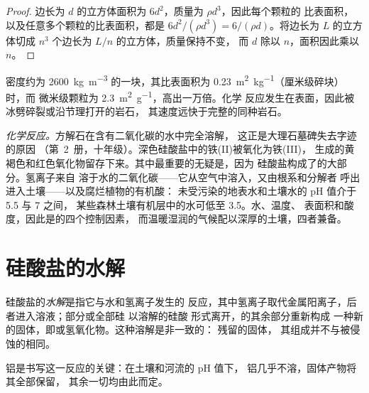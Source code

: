 \begin{proof}
边长为 $d$ 的立方体面积为 $6d^2$，质量为 $\rho d^3$，因此每个颗粒的
比表面积，以及任意多个颗粒的比表面积，都是 $6d^2/(\rho d^3)
= 6/(\rho d)$。将边长为 $L$ 的立方体切成 $n^3$ 个边长为 $L/n$ 的立方体，质量保持不变，
而 $d$ 除以 $n$，面积因此乘以 $n$。
\end{proof}

密度约为 \qty{2600}{kg.m^{-3}} 的一块，其比表面积为
\qty{0.23}{m^2.kg^{-1}}（厘米级碎块）时，而
微米级颗粒为 \qty{2.3}{m^2.g^{-1}}，高出一万倍。化学
反应发生在表面，因此被冰劈碎裂或沿节理打开的岩石，
其速度远快于完整的同种岩石。

\emph{化学反应。}方解石在含有二氧化碳的水中完全溶解，
这正是大理石墓碑失去字迹的原因
（第~2~册，十年级）。深色硅酸盐中的铁(II)被氧化为铁(III)，
生成的黄褐色和红色氧化物留存下来。其中最重要的无疑是，因为
硅酸盐构成了的大部分。氢离子来自
溶于水的二氧化碳——它从空气中溶入，又由根系和分解者
呼出进入土壤——以及腐烂植物的有机酸：
未受污染的地表水和土壤水的 pH 值介于 5.5 与 7 之间，
某些森林土壤有机层中的水可低至 3.5。水、温度、
表面积和酸度，因此是的四个控制因素，
而温暖湿润的气候配以深厚的土壤，四者兼备。

\section{硅酸盐的水解}\label{sec:b1:weathering-clays:hydrolysis}

\begin{definition}[硅酸盐的水解]\label{def:b1:weathering-clays:hydrolysis}
硅酸盐的\emph{水解}是指它与水和氢离子发生的
反应，其中氢离子取代金属阳离子，后者进入溶液；部分或全部硅
以溶解的硅酸  形式离开，的其余部分重新构成
一种新的固体，即或氢氧化物。这种溶解是非一致的：
残留的固体，
其组成并不与被侵蚀的相同。
\end{definition}

铝是书写这一反应的关键：在土壤和河流的 pH 值下，
铝几乎不溶，固体产物将其全部保留，
其余一切均由此而定。


